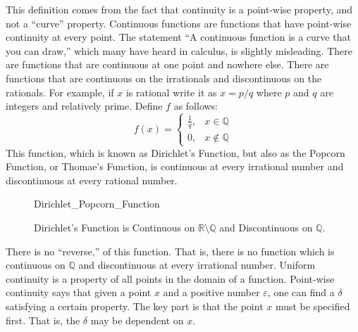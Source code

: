 \documentclass[crop=false,class=book,oneside]{standalone}
\begin{document}
            This definition comes from the fact that
            continuity is a point-wise property, and not a
            ``curve'' property. Continuous functions are
            functions that have point-wise continuity at
            every point. The statement ``A continuous function
            is a curve that you can draw,'' which many have
            heard in calculus, is slightly misleading. There
            are functions that are continuous at one point and
            nowhere else. There are functions that are
            continuous on the irrationals and discontinuous
            on the rationals. For example, if $x$ is
            rational write it as $x=p/q$ where $p$ and
            $q$ are integers and relatively prime. Define $f$
            as follows:
            \begin{equation}
                f(x)=
                \begin{cases}
                    \frac{1}{q},&x\in\mathbb{Q}\\
                    0,&x\notin\mathbb{Q}
                \end{cases}
            \end{equation}
            This function, which is known as
            Dirichlet's Function, but also as the Popcorn
            Function, or Thomae's Function, is continuous at every
            irrational number and discontinuous at every
            rational number.
            \begin{figure}[H]
                \captionsetup{type=figure}
                \centering
                
                          {Dirichlet_Popcorn_Function}
                \caption{Dirichlet's Function is Continuous on
                         $\mathbb{R}\setminus\mathbb{Q}$ and
                         Discontinuous on $\mathbb{Q}$.}
                \label{fig:Funct:Dirichlet_Thomae_Function}
            \end{figure}
            There is no ``reverse,'' of this
            function. That is, there is no function which is
            continuous on $\mathbb{Q}$ and discontinuous at
            every irrational number. Uniform continuity is a
            property of all points in the domain of a function.
            Point-wise continuity says that given a point $x$
            and a positive number
            $\varepsilon$, one can find a $\delta$ satisfying a
            certain property. The key part is that the point $x$ must
            be specified first. That is, the $\delta$
            may be dependent on $x$.
\end{document}
